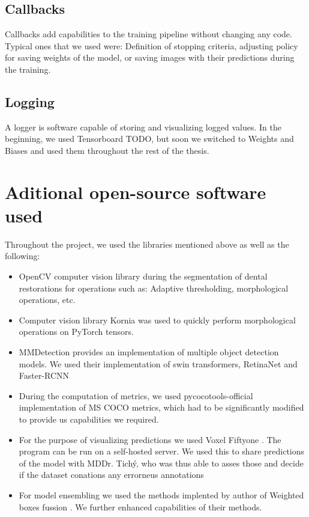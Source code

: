 \subsection{Callbacks}
Callbacks add capabilities to the training pipeline without changing any code. Typical ones that we used were: Definition of stopping criteria, adjusting policy for saving weights of the model, or saving images with their predictions during the training.

\subsection{Logging}
A logger is software capable of storing and visualizing logged values. In the beginning, we used Tensorboard TODO, but soon we switched to Weights and Biases \cite{wandb} and used them throughout the rest of the thesis.

\section{Aditional open-source software used}
Throughout the project, we used the libraries mentioned above as well as the following:
\begin{itemize}
    \item OpenCV \cite{opencv_library}  computer vision library during the segmentation of dental restorations for operations such as: Adaptive thresholding, morphological operations, etc.
    \item Computer vision library Kornia \cite{eriba2019kornia} was used to quickly perform morphological operations on PyTorch tensors.
    \item MMDetection \cite{mmdetection} provides an implementation of multiple object detection models. We used their implementation of swin transformers, RetinaNet and Faster-RCNN
    \item During the computation of metrics, we used pycocotools-official \cite{pycocotools} implementation of MS COCO metrics, which had to be significantly modified to provide us capabilities we required.
    \item For the purpose of visualizing predictions we used Voxel Fiftyone \cite{moorefiftyone}. The program can be run on a self-hosted server. We used this to share predictions of the model with MDDr. Tichý, who was thus able to asses those and decide if the dataset conations any errorneus annotations
    \item For model ensembling we used the methods implented by author of Weighted boxes fussion \cite{Solovyev2019}. We further enhanced capabilities of their methods.
\end{itemize}
